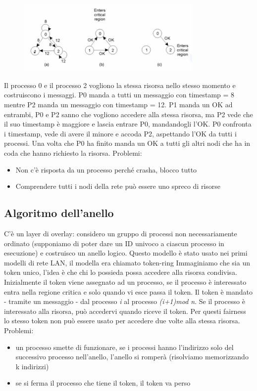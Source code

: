 \documentclass[12pt,italian]{report}
\begin{document}
\begin{figure}[h]
\centering
\includegraphics[width=90mm]{img/ricart.png}
\end{figure}
Il processo 0 e il processo 2 vogliono la stessa risorsa nello stesso momento e costruiscono i messaggi. P0 manda a tutti un messaggio con timestamp = 8 mentre P2 manda un messaggio con timestamp = 12. P1 manda un OK ad entrambi, P0 e P2 sanno che vogliono accedere alla stessa risorsa, ma P2 vede che il suo timestamp è maggiore e lascia entrare P0, mandandogli l'OK. P0 confronta i timestamp, vede di avere il minore e accoda P2, aspettando l'OK da tutti i processi.  Una volta che P0 ha finito manda un OK a tutti gli altri nodi che ha in coda che hanno richiesto la risorsa. 
\bigbreak
\noindent Problemi:
\begin{itemize}
    \item Non c'è risposta da un processo perché crasha, blocco tutto
    \item Comprendere tutti i nodi della rete può essere uno spreco di risorse
\end{itemize}

\subsection{Algoritmo dell'anello}
C'è un layer di overlay: considero un gruppo di processi non necessariamente ordinato (supponiamo di poter dare un ID univoco a ciascun processo in esecuzione) e costruisco un anello logico. Questo modello è stato usato nei primi modelli di rete LAN, il modella era chiamato token-ring
\bigbreak
Immaginiamo che sia un token unico, l'idea è che chi lo possieda possa accedere alla risorsa condivisa. Inizialmente il token viene assegnato ad un processo, se il processo è interessato entra nella regione critica e solo quando vi esce passa il token. Il token è mandato - tramite un messaggio - dal processo \textit{i} al processo \textit{(i+1)mod n}. Se il processo è interessato alla risorsa, può accedervi quando riceve il token. Per questi fairness lo stesso token non può essere usato per accedere due volte alla stessa risorsa. 
\bigbreak
\noindent Problemi:
\begin{itemize}
    \item un processo smette di funzionare, se i processi hanno l'indirizzo solo del successivo processo nell'anello, l'anello si romperà (risolviamo memorizzando k indirizzi) 
    \item se si ferma il processo che tiene il token, il token va perso
\end{itemize}
\end{document}
